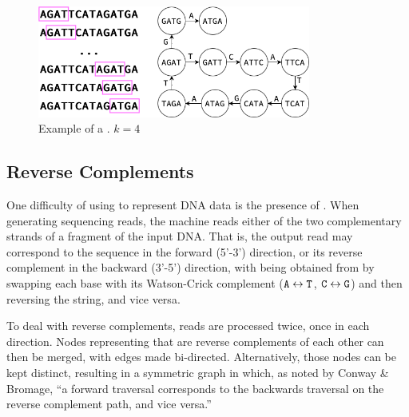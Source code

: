 \begin{figure}[htbp]
	\begin{center}
    \includegraphics[width=0.8\textwidth]{figures/dbg-example}
	\end{center}
	\caption{Example of a \dBG. $k=4$}\label{fig:dbgexample}
\end{figure}

\subsection{Reverse Complements}
\label{subsec:dBG-reversecomplements}

One difficulty of using \dBG to represent DNA data is the presence of . When generating sequencing reads, the machine reads either of the two complementary strands of a fragment of the input DNA. That is, the output read may correspond to the sequence  in the forward (5'-3') direction, or its reverse complement  in the backward (3'-5') direction, with
 being obtained from  by swapping each base with its Watson-Crick complement
($\mathtt{A} \leftrightarrow \mathtt{T}$, $\mathtt{C} \leftrightarrow \mathtt{G}$) and then reversing the string, and vice versa. 

To deal with reverse complements, reads are processed twice, once in each direction. Nodes representing  that are reverse complements of each other can then be merged, with edges made bi-directed. Alternatively, those nodes can be kept distinct, resulting in a symmetric graph in which, as noted by Conway \& Bromage, ``a forward traversal corresponds to the backwards traversal on the reverse complement path, and vice versa.'' \cite{Conway2011}

